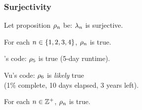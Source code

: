 \documentclass[letterpaper, 14pt]{extarticle}
\begin{document}
\begin{flushleft}

\subsubsection{Surjectivity}

\begin{definition}
Let proposition $\rho_{n}$ be: $\lambda_{n}$ is surjective.
\end{definition}

\begin{remark}
For each $n \in \{1, 2, 3, 4\}$, $\rho_{n}$ is true.
\end{remark}

\begin{remark}
\cm's code: $\rho_{5}$ is true (5-day runtime).
\end{remark}

\begin{remark}
Vu's code: $\rho_{6}$ is \emph{likely} true \\
(1\% complete, 10 days elapsed, 3 years left).
\end{remark}

\begin{conjecture}
For each $n \in \mathbb{Z}^+$, $\rho_{n}$ is true.
\end{conjecture}


\end{flushleft}
\end{document}
